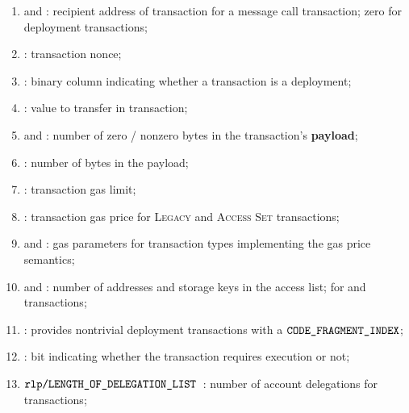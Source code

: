 \begin{enumerate}[resume]
	\item
		\txnDataRlpToAddrHi{} and
		\txnDataRlpToAddrLo{}:
		recipient address of transaction for a message call transaction;
		zero for deployment transactions;
	\item
		\txnDataRlpNonce{}:
		transaction nonce;
	\item
		\txnDataRlpIsDep{}:
		binary column indicating whether a transaction is a deployment;
	\item
		\txnDataRlpValue{}:
		value to transfer in transaction;
	\item
		\txnDataRlpNumberOfZeroBytes{} and
		\txnDataRlpNumberOfNonzeroBytes{}:
		number of zero / nonzero bytes in the transaction's \textbf{payload};
	\item
		\txnDataRlpDataSize{}:
		number of bytes in the payload;
	\item
		\txnDataRlpGasLimit{}:
		transaction gas limit;
	\item
		\txnDataRlpGasPrice{}:
		transaction gas price for
		\textsc{Legacy} and
		\textsc{Access Set} transactions;
	\item
		\txnDataRlpMaxPriorityFeePerGas{}  and
		\txnDataRlpMaxFeePerGas{}:
		gas parameters for transaction types implementing the
		\cite{EIP-1559} gas price semantics;
	\item
		\txnDataRlpNumberOfAccessListAddresses{} and
		\txnDataRlpNumberOfAccessListStorageKeys{}:
		number of addresses and storage keys in the access list;
		for \cite{EIP-2929} and \cite{EIP-2930} transactions;
	\item
		\txnDataRlpCfi{}:
		provides nontrivial deployment transactions with a $\texttt{CODE\_FRAGMENT\_INDEX}$;
	\item
		\txnDataRlpRequiresEvmExecution{}:
		bit indicating whether the transaction requires \evm{} execution or not;
	\item
		$\texttt{rlp}\texttt{/}{\texttt{\texttt{LENGTH\_OF\_DELEGATION\_LIST} }}$:
		number of account delegations
		for \cite{EIP-7702} transactions;
\end{enumerate}
